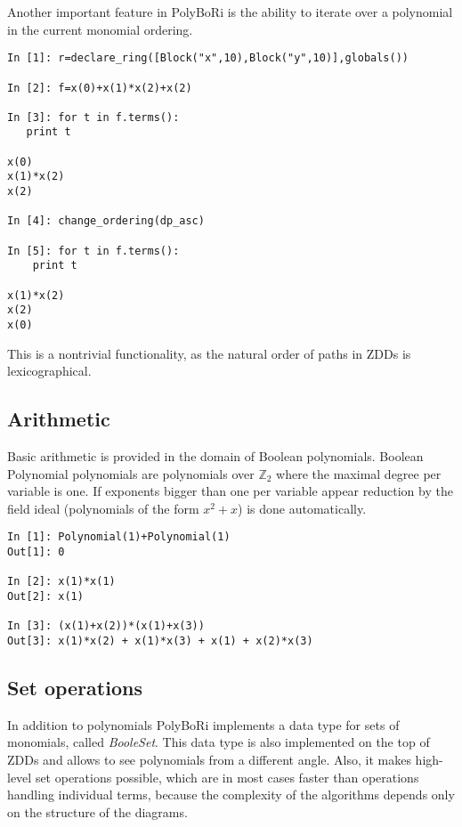 \documentclass[]{article}
\newcommand{\PolyBoRi}{{\sc PolyBoRi}\xspace}
\newcommand{\functionname}[1]{\textit{#1}\xspace}
\newcommand{\Ztwo}{\mathbb{Z}_2}
\newcounter{thm}
\begin{document}
Another important feature in \PolyBoRi is the ability to iterate over a polynomial in the current monomial ordering.

\begin{lstlisting}
In [1]: r=declare_ring([Block("x",10),Block("y",10)],globals())

In [2]: f=x(0)+x(1)*x(2)+x(2)

In [3]: for t in f.terms():
   print t
   
x(0)
x(1)*x(2)
x(2)

In [4]: change_ordering(dp_asc)

In [5]: for t in f.terms():
    print t

x(1)*x(2)
x(2)
x(0)
\end{lstlisting}
%
This is a nontrivial functionality, as the natural order of paths in ZDDs is lexicographical.


\subsection{Arithmetic}
Basic arithmetic is provided in the domain of Boolean polynomials. Boolean Polynomial polynomials are polynomials over $\Ztwo$ where the maximal degree per variable is one.
If exponents bigger than one per variable appear reduction by the field ideal (polynomials of the form $x^2+x$) is done automatically.
\begin{lstlisting}
In [1]: Polynomial(1)+Polynomial(1)
Out[1]: 0

In [2]: x(1)*x(1)
Out[2]: x(1)

In [3]: (x(1)+x(2))*(x(1)+x(3))
Out[3]: x(1)*x(2) + x(1)*x(3) + x(1) + x(2)*x(3)
\end{lstlisting}

\subsection{Set operations}
In addition to polynomials  \PolyBoRi implements a data type for sets of monomials, called \functionname{BooleSet}.
This data type is also implemented on the top of ZDDs and allows to see
polynomials
from a different angle. Also, it makes high-level set operations possible, which are in most cases faster than operations handling individual terms, because the complexity of the algorithms depends only on the structure of the diagrams.
\end{document}
